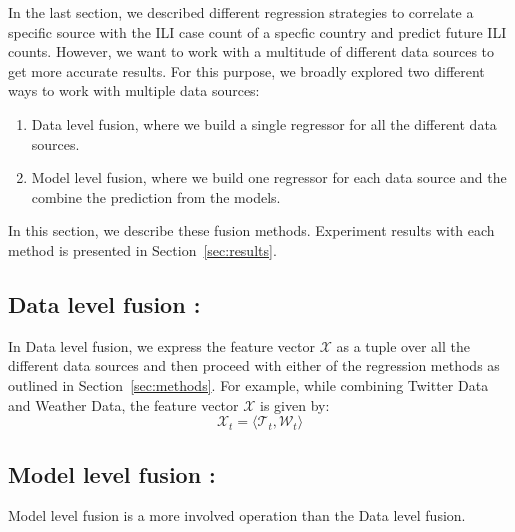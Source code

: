 
In the last section, we described different regression strategies to correlate a specific source with the ILI case count of a specfic country and predict future ILI counts. However, we want to work with a multitude of different data sources to get more accurate results. For this purpose, we broadly explored two different ways to work with multiple data sources:

\begin{enumerate}
  \item Data level fusion, where we build a single regressor for all the different data
    sources.
  \item Model level fusion, where we build one regressor for each data source and 
    the combine the prediction from the models.
\end{enumerate}

In this section, we describe these fusion methods. Experiment results with each method is presented in Section~\ref{sec:results}.

\subsection{\label{sec:fusion:data} Data level fusion :}
In Data level fusion, we express the feature vector $\mathcal{X}$ as a tuple over all the different data 
sources and then proceed with either of the regression methods as outlined in Section~\ref{sec:methods}.
For example, while combining Twitter Data and Weather Data, the feature vector $\mathcal{X}$ is given 
by:
\[\mathcal{X}_t = \langle \mathcal{T}_t, \mathcal{W}_t \rangle
\]

\subsection{\label{sec:fusion:model} Model level fusion :}
Model level fusion is a more involved operation than the Data level fusion. 

